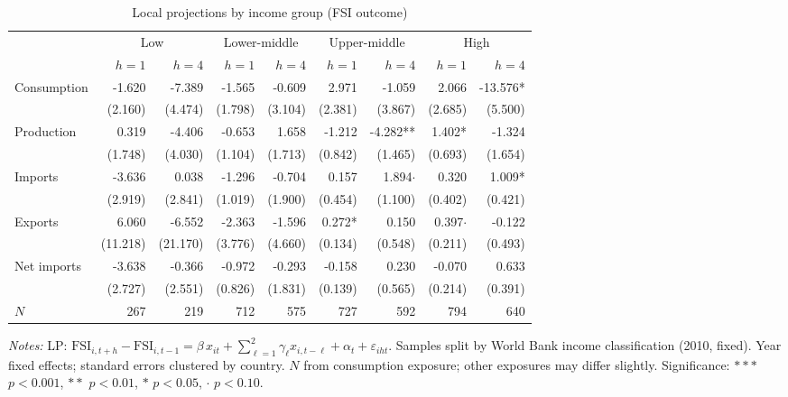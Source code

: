 
\begin{table}[htbp]
\centering
\caption{Local projections by income group (FSI outcome)}
\label{tab:income-lp}
\begin{threeparttable}
\small
\begin{tabular}{l rr rr rr rr}
\toprule
 & \multicolumn{2}{c}{Low} & \multicolumn{2}{c}{Lower-middle} & \multicolumn{2}{c}{Upper-middle} & \multicolumn{2}{c}{High} \\
\cmidrule(lr){2-3} \cmidrule(lr){4-5} \cmidrule(lr){6-7} \cmidrule(lr){8-9}
 & $h=1$ & $h=4$ & $h=1$ & $h=4$ & $h=1$ & $h=4$ & $h=1$ & $h=4$ \\
\midrule
Consumption & -1.620 & -7.389 & -1.565 & -0.609 & 2.971 & -1.059 & 2.066 & -13.576* \\
   & (2.160) & (4.474) & (1.798) & (3.104) & (2.381) & (3.867) & (2.685) & (5.500) \\[4pt]
Production & 0.319 & -4.406 & -0.653 & 1.658 & -1.212 & -4.282** & 1.402* & -1.324 \\
   & (1.748) & (4.030) & (1.104) & (1.713) & (0.842) & (1.465) & (0.693) & (1.654) \\[4pt]
Imports & -3.636 & 0.038 & -1.296 & -0.704 & 0.157 & 1.894$\cdot$ & 0.320 & 1.009* \\
   & (2.919) & (2.841) & (1.019) & (1.900) & (0.454) & (1.100) & (0.402) & (0.421) \\[4pt]
Exports & 6.060 & -6.552 & -2.363 & -1.596 & 0.272* & 0.150 & 0.397$\cdot$ & -0.122 \\
   & (11.218) & (21.170) & (3.776) & (4.660) & (0.134) & (0.548) & (0.211) & (0.493) \\[4pt]
Net imports & -3.638 & -0.366 & -0.972 & -0.293 & -0.158 & 0.230 & -0.070 & 0.633 \\
   & (2.727) & (2.551) & (0.826) & (1.831) & (0.139) & (0.565) & (0.214) & (0.391) \\[4pt]
\midrule
$N$ & 267 & 219 & 712 & 575 & 727 & 592 & 794 & 640 \\
\bottomrule
\end{tabular}
\begin{tablenotes}\small
\item \textit{Notes:} LP: $\text{FSI}_{i,t+h} - \text{FSI}_{i,t-1} = \beta\, x_{it} + \sum_{\ell=1}^{2}\gamma_\ell x_{i,t-\ell} + \alpha_t + \varepsilon_{iht}$. Samples split by World Bank income classification (2010, fixed). Year fixed effects; standard errors clustered by country. $N$ from consumption exposure; other exposures may differ slightly. Significance: $***$ $p<0.001$, $**$ $p<0.01$, $*$ $p<0.05$, $\cdot$ $p<0.10$.
\end{tablenotes}
\end{threeparttable}
\end{table}
